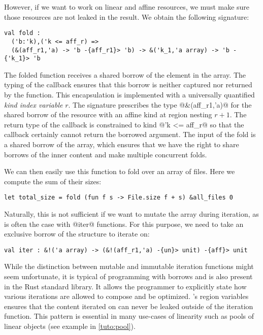 However, if we want to work on linear and affine resources,
we must make sure those resources are not leaked in the result.
We obtain the following signature:
\begin{lstlisting}
val fold :
  ('b:'k),('k <= aff_r) =>
  (&(aff_r1,'a) -> 'b -{aff_r1}> 'b) -> &('k_1,'a array) -> 'b -{'k_1}> 'b
\end{lstlisting}

The folded function receives a shared borrow of the element in the array.
The typing of the callback ensures
that this borrow is neither captured nor returned by the function.
%
This encapsulation is implemented with a universally quantified \emph{kind index variable} $r$.
The signature prescribes the type @&(aff_r1,'a)@ for the
shared borrow of the resource with an affine kind at region nesting $r+1$. The return
type of the callback is constrained to kind @'k <= aff_r@
so that the callback certainly cannot return the borrowed argument.
%
The input of the fold is a shared borrow of the array,
which ensures that we have the right to share borrows of the inner content and
make multiple concurrent folds.

We can then easily use this function to fold over an array of files. Here
we compute the sum of their sizes:
\begin{lstlisting}
let total_size = fold (fun f s -> File.size f + s) &all_files 0
\end{lstlisting}

Naturally, this is not sufficient if we want to mutate the array during iteration,
as is often the case with @iter@ functions.
For this purpose, we need to take an exclusive borrow of the structure to iterate
on:
\begin{lstlisting}
val iter : &!('a array) -> (&!(aff_r1,'a) -{un}> unit) -{aff}> unit
\end{lstlisting}

While the distinction between mutable and immutable iteration functions
might seem unfortunate, it is typical of
programming with borrows and is also present in the Rust standard library.
It allows the programmer to explicitly state how various iterations
are allowed to compose and be optimized.
\lang's region variables ensures that the content iterated on can never
be leaked outside of the iteration function.
This pattern is essential in many use-cases of linearity such
as pools of linear objects (see example in \cref{tuto:pool}).

\lstDeleteShortInline@

